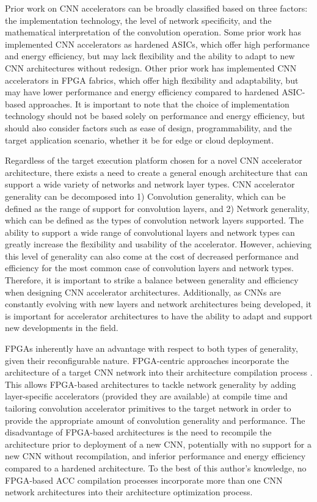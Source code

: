 Prior work on CNN accelerators can be broadly classified based on three factors:
the implementation technology, the level of network specificity, and the
mathematical interpretation of the convolution operation. Some prior work has
implemented CNN accelerators as hardened ASICs, which offer high performance and
energy efficiency, but may lack flexibility and the ability to adapt to new CNN
architectures without redesign. Other prior work has implemented CNN
accelerators in FPGA fabrics, which offer high flexibility and adaptability, but
may have lower performance and energy efficiency compared to hardened ASIC-based
approaches. It is important to note that the choice of implementation technology
should not be based solely on performance and energy efficiency, but should also
consider factors such as ease of design, programmability, and the target
application scenario, whether it be for edge or cloud deployment.

Regardless of the target execution platform chosen for a novel CNN accelerator
architecture, there exists a need to create a general enough architecture that
can support a wide variety of networks and network layer types. CNN accelerator
generality can be decomposed into 1) Convolution generality, which can be
defined as the range of support for convolution layers, and 2) Network
generality, which can be defined as the types of convolution network layers
supported. The ability to support a wide range of convolutional layers and
network types can greatly increase the flexibility and usability of the
accelerator. However, achieving this level of generality can also come at the
cost of decreased performance and efficiency for the most common case of
convolution layers and network types. Therefore, it is important to strike a
balance between generality and efficiency when designing CNN accelerator
architectures. Additionally, as CNNs are constantly evolving with new layers and
network architectures being developed, it is important for accelerator
architectures to have the ability to adapt and support new developments in the
field.

FPGAs inherently have an advantage with respect to both types of generality,
given their reconfigurable nature. FPGA-centric approaches incorporate the
architecture of a target CNN network into their architecture compilation process
\cite{caffeine}. This allows FPGA-based architectures to tackle network
generality by adding layer-specific accelerators (provided they are available)
at compile time and tailoring convolution accelerator primitives to the target
network in order to provide the appropriate amount of convolution generality and
performance. The disadvantage of FPGA-based architectures is the need to
recompile the architecture prior to deployment of a new CNN, potentially with no
support for a new CNN without recompilation, and inferior performance and energy
efficiency compared to a hardened architecture. To the best of this author's
knowledge, no \ac{FPGA}-based \ac{ACC} compilation processes incorporate more
than one \ac{CNN} network architectures into their architecture optimization
process. 

